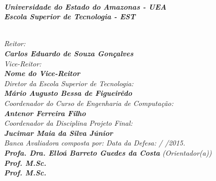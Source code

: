 \begin{spacing}{1.4}
\textit{\textbf{\\
Universidade do Estado do Amazonas - UEA\\
Escola Superior de Tecnologia - EST}}

\textit{\\
Reitor:\\
\textbf{
Carlos Eduardo de Souza Gon\c{c}alves}\\
Vice-Reitor:\\ \textbf{Nome do Vice-Reitor}}
\\
\textit{
Diretor da Escola Superior de Tecnologia:\\
\textbf{M\'{a}rio Augusto Bessa de Figueir\^{e}do}}
\\
\textit{
Coordenador do Curso de Engenharia de Computa\c{c}\~{a}o:\\
\textbf{Antenor Ferreira Filho}}
\\
\textit{
Coordenador da Disciplina Projeto Final:\\
\textbf{Jucimar Maia da Silva J\'{u}nior}}
\\[12pt]
\textit{
Banca Avaliadora composta por: \hfill Data da Defesa:  /  /2015.\\
}
\textit{
\textbf{Profa. Dra. Elloá Barreto Guedes da Costa} (Orientador(a))\\
\textbf{Prof. M.Sc. }\\%
\textbf{Prof. M.Sc. }
}
\ \ \\
 \begin{small}
\begin{center}
\end{center}
\end{small}
\end{spacing}
 \newpage
